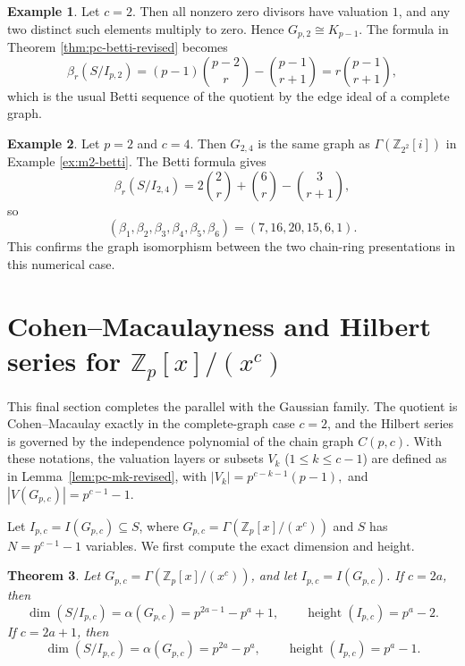 \documentclass[12pt]{article}
\newtheorem{theorem}{Theorem}[section]
\theoremstyle{definition}
\newtheorem{example}[theorem]{Example}
\begin{document}
\medskip

\begin{example}\label{ex:complete-c2}
	Let $c=2$.  Then all nonzero zero divisors have valuation $1$, and any two distinct such elements multiply to zero.  Hence
	$ G_{p,2}\cong K_{p-1}. $
	The formula in Theorem \ref{thm:pc-betti-revised} becomes
	$$
	\beta_r(S/I_{p,2})=(p-1)\binom{p-2}{r}-\binom{p-1}{r+1}=r\binom{p-1}{r+1},
	$$
	which is the usual Betti sequence of the quotient by the edge ideal of a complete graph.
\end{example}

\medskip

\begin{example}\label{ex:pc-24-betti}
	Let $p=2$ and $c=4$.  Then $G_{2,4}$ is the same graph as $\Gamma(\mathbb{Z}_{2^2}[i])$ in Example \ref{ex:m2-betti}.  The Betti formula gives
	$$
	\beta_r(S/I_{2,4})=2\binom{2}{r}+\binom{6}{r}-\binom{3}{r+1},
	$$
	so
	$$
	(\beta_1,\beta_2,\beta_3,\beta_4,\beta_5,\beta_6)=(7,16,20,15,6,1).
	$$
	This confirms the graph isomorphism between the two chain-ring presentations in this numerical case.
\end{example}


\section{Cohen--Macaulayness and Hilbert series for \texorpdfstring{$\mathbb{Z}_p[x]/(x^c)$}{Z_p[x]/(x^c)}}\label{sec:pc-CM-Hilbert}
 This final section completes the parallel with the Gaussian family.  The quotient is Cohen--Macaulay exactly in the complete-graph case $c=2$, and the Hilbert series is governed by the independence polynomial of the chain graph $C(p,c)$.
With these notations, the valuation layers or subsets $V_k$ ($1\le k\le c-1$) are defined as in
Lemma~\ref{lem:pc-mk-revised}, with $|V_k| = p^{c-k-1}(p-1),$ and	$|V(G_{p,c})| = p^{c-1}-1.$ 
\medskip

Let $I_{p,c}=I(G_{p,c})\subseteq S$, where $G_{p,c}=\Gamma(\mathbb{Z}_p[x]/(x^c))$ and $S$ has
$ N=p^{c-1}-1 $
variables.  We first compute the exact dimension and height.

\medskip

\begin{theorem}\label{thm:pc-dim-height}
	Let $G_{p,c}=\Gamma(\mathbb{Z}_p[x]/(x^c))$, and let $I_{p,c}=I(G_{p,c})$.  If $c=2a$, then
	$$
	\dim(S/I_{p,c})=\alpha(G_{p,c})=p^{2a-1}-p^a+1,
	\qquad
	\operatorname{height}(I_{p,c})=p^a-2.
	$$
	If $c=2a+1$, then
	$$
	\dim(S/I_{p,c})=\alpha(G_{p,c})=p^{2a}-p^a,
	\qquad
	\operatorname{height}(I_{p,c})=p^a-1.
	$$
\end{theorem}
\end{document}
